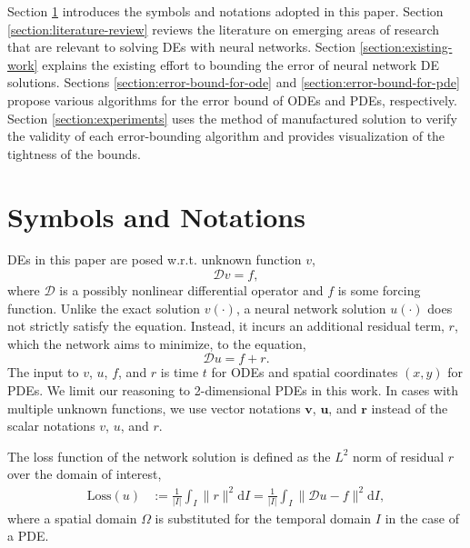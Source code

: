 \documentclass{uai2023}
\newcommand{\vect}[1]{\mathbf{#1}}
\newcommand{\Loss}{\mathrm{Loss}}
\begin{document}
    Section \ref{section:symbols-and-notations} introduces the symbols and notations adopted in this paper.
    Section \ref{section:literature-review} reviews the literature on emerging areas of research that are relevant to solving DEs with neural networks.
    Section \ref{section:existing-work} explains the existing effort to bounding the error of neural network DE solutions.
    Sections \ref{section:error-bound-for-ode} and \ref{section:error-bound-for-pde} propose various algorithms for the error bound of ODEs and PDEs, respectively.
    Section \ref{section:experiments} uses the method of manufactured solution to verify the validity of each error-bounding algorithm and provides visualization of the tightness of the bounds.

\section{Symbols and Notations} \label{section:symbols-and-notations}
    DEs in this paper are posed w.r.t. unknown function $v$,
    {
        \small
        \begin{equation*}
            \mathcal{D} v = f,
        \end{equation*}
    }
    where $\mathcal{D}$ is a possibly nonlinear differential operator and $f$ is some forcing function.
    Unlike the exact solution $v(\cdot)$, a neural network solution $u(\cdot)$ does not strictly satisfy the equation.
    Instead, it incurs an additional residual term, $r$, which the network aims to minimize, to the equation, 
    {
        \small
        \begin{equation*}
            \mathcal{D} u = f + r.
        \end{equation*}
    }
    The input to $v$, $u$, $f$, and $r$ is time $t$ for ODEs and spatial coordinates $(x, y)$ for PDEs.
    We limit our reasoning to 2-dimensional PDEs in this work.
    In cases with multiple unknown functions, we use vector notations $\vect{v}$, $\vect{u}$, and $\vect{r}$ instead of the scalar notations $v$, $u$, and $r$.

    The loss function of the network solution is defined as the $L^2$ norm of residual $r$ over the domain of interest,
    {
        \small
        \begin{align}
            \Loss{}(u) &:= \frac{1}{|I|} \int_{I} \|r\|^2 \mathrm{d}I = \frac{1}{|I|} \int_{I} \|\mathcal{D} u - f\|^2 \mathrm{d}I,
        \end{align}
    }
    where a spatial domain $\Omega$ is substituted for the temporal domain $I$ in the case of a PDE.
\end{document}
